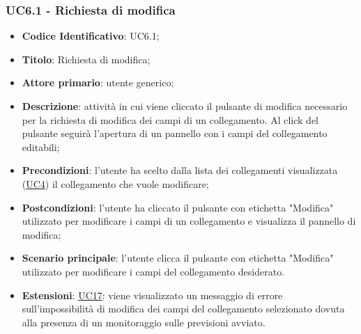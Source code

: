 	\subsubsection{UC6.1 - Richiesta di modifica}
		\begin{itemize}
			\item\textbf{Codice Identificativo}: UC6.1;
			\item\textbf{Titolo}: Richiesta di modifica;
			\item\textbf{Attore primario}: utente generico;
			\item\textbf{Descrizione}: attività in cui viene cliccato il pulsante di modifica necessario per la richiesta di modifica dei campi di un collegamento. Al click del pulsante seguirà l'apertura di un pannello con i campi del collegamento editabili;
			\item\textbf{Precondizioni}: l'utente ha scelto dalla lista dei collegamenti visualizzata (\hyperref[par:UC4]{UC4}) il collegamento che vuole modificare;
			\item\textbf{Postcondizioni}: l'utente ha cliccato il pulsante con etichetta "Modifica" utilizzato per modificare i campi di un collegamento e visualizza il pannello di modifica;
			\item\textbf{Scenario principale}: l'utente clicca il pulsante con etichetta "Modifica" utilizzato per modificare i campi del collegamento desiderato.
			\item\textbf{Estensioni}: \hyperref[par:UC17]{UC17}: viene visualizzato un messaggio di errore sull'impossibilità di modifica dei campi del collegamento selezionato dovuta alla presenza di un monitoraggio sulle previsioni avviato.					
	
		\end{itemize}		
		
	\label{par:UC6.2}
